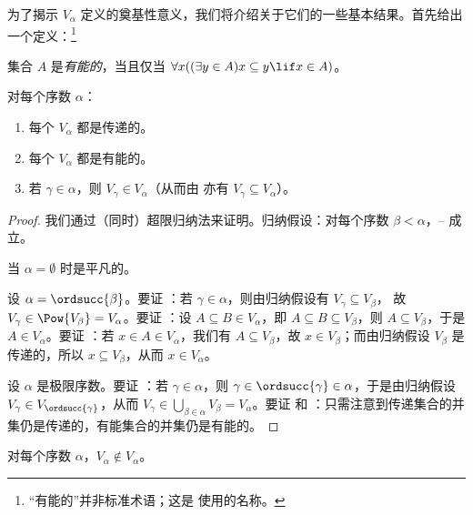 \documentclass[../../../include/open-logic-section]{subfiles}
\begin{document}

为了揭示 $V_\alpha$ 定义的奠基性意义，我们将介绍关于它们的一些基本结果。首先给出一个定义：\footnote{“有能的”并非标准术语；这是 \citet{ButtonLT1} 使用的名称。}

\begin{defn}
	集合 $A$ 是\emph{有能的}，当且仅当 $\forall x((\exists y \in A)x \subseteq y \lif x \in A)$。
\end{defn}
\begin{lem}
对每个序数 $\alpha$：
\begin{enumerate}
	\item{} 每个 $V_\alpha$ 都是传递的。
	\item{} 每个 $V_\alpha$ 都是有能的。
	\item{} 若 $\gamma \in \alpha$，则 $V_\gamma
	\in V_\alpha$（从而由  亦有 $V_\gamma \subseteq V_\alpha$）。
\end{enumerate}
\end{lem}

\begin{proof}
我们通过（同时）超限归纳法来证明。归纳假设：对每个序数 $\beta < \alpha$，-- 成立。

当 $\alpha = \emptyset$ 时是平凡的。

设 $\alpha = \ordsucc{\beta}$。要证 ：若
$\gamma \in \alpha$，则由归纳假设有 $V_\gamma \subseteq V_\beta$，
故 $V_\gamma \in \Pow{V_\beta} = V_\alpha$。要证
：设 $A \subseteq B \in V_\alpha$，即 $A
\subseteq B \subseteq V_\beta$，则 $A \subseteq V_\beta$，于是 $A \in
V_\alpha$。要证 ：若 $x \in A \in
V_\alpha$，我们有 $A \subseteq V_\beta$，故 $x \in V_\beta$；而由归纳假设 $V_\beta$ 是传递的，所以 $x
\subseteq V_\beta$，从而 $x \in V_\alpha$。

设 $\alpha$ 是极限序数。要证 ：若
$\gamma \in \alpha$，则 $\gamma \in \ordsucc{\gamma} \in \alpha$，于是由归纳假设 $V_\gamma \in V_{\ordsucc{\gamma}}$，从而
$V_\gamma \in \bigcup_{\beta \in \alpha} V_\beta = V_\alpha$。要证
 和 ：只需注意到传递集合的并集仍是传递的，有能集合的并集仍是有能的。
\end{proof}

\begin{lem}
对每个序数 $\alpha$，$V_\alpha \notin V_\alpha$。
\end{lem}
\end{document}
